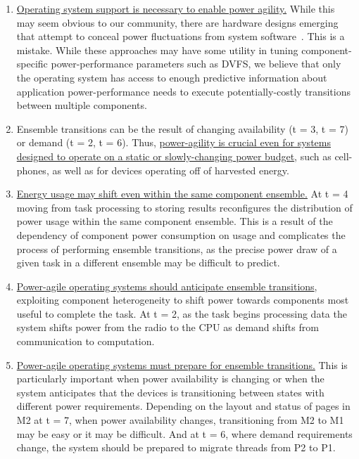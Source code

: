 \begin{enumerate}

\item \uline{Operating system support is necessary to enable power agility.}
While this may seem obvious to our community, there are hardware designs
emerging that attempt to conceal power fluctuations from system
software~\cite{FIXME}. This is a mistake. While these approaches may have
some utility in tuning component-specific power-performance parameters such
as DVFS, we believe that only the operating system has access to enough
predictive information about application power-performance needs to execute
potentially-costly transitions between multiple components.

\item Ensemble transitions can be the result of changing availability (t = 3,
t = 7) or demand (t = 2, t = 6). Thus, \uline{power-agility is crucial even
for systems designed to operate on a static or slowly-changing power budget},
such as cell-phones, as well as for devices operating off of harvested
energy.

\item \uline{Energy usage may shift even within the same component ensemble.}
At t = 4 moving from task processing to storing results reconfigures the
distribution of power usage within the same component ensemble. This is a
result of the dependency of component power consumption on usage and
complicates the process of performing ensemble transitions, as the precise
power draw of a given task in a different ensemble may be difficult to
predict.

\item \uline{Power-agile operating systems should anticipate ensemble
transitions}, exploiting component heterogeneity to shift power towards
components most useful to complete the task. At t = 2, as the task begins
processing data the system shifts power from the radio to the CPU as demand
shifts from communication to computation.

\item \uline{Power-agile operating systems must prepare for ensemble
transitions.} This is particularly important when power availability is
changing or when the system anticipates that the devices is transitioning
between states with different power requirements. Depending on the layout and
status of pages in M2 at t = 7, when power availability changes,
transitioning from M2 to M1 may be easy or it may be difficult. And at t = 6,
where demand requirements change, the system should be prepared to migrate
threads from P2 to P1.

\end{enumerate}
